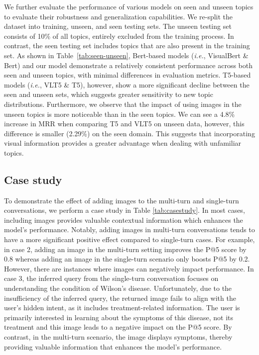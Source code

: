 \documentclass[11pt]{article}
\begin{document}
We further evaluate the performance of various models on seen and unseen topics to evaluate their robustness and generalization capabilities.  We re-split the \OurData{} dataset into training, unseen, and seen testing sets. The unseen testing set consists of 10\% of all topics, entirely excluded from the training process. In contrast, the seen testing set includes topics that are also present in the training set.
As shown in Table~\ref{tab:seen-unseen}, Bert-based models (\textit{i.e.}, VisualBert \& Bert) and our model demonstrate a relatively consistent performance across both seen and unseen topics, with minimal differences in evaluation metrics. T5-based models (\textit{i.e.}, VLT5 \& T5), however, show a more significant decline between the seen and unseen sets, which suggests greater sensitivity to new topic distributions. Furthermore, we observe that the impact of using images in the unseen topics is more noticeable than in the seen topics. We can see a 4.8\% increase in MRR when comparing T5 and VLT5 on unseen data, however, this difference is smaller (2.29\%) on the seen domain. This suggests that incorporating visual information provides a greater advantage when dealing with unfamiliar topics.

\subsection{Case study}
To demonstrate the effect of adding images to the multi-turn and single-turn conversations, we perform a case study in Table \ref{tab:casestudy}. In most cases, including images provides valuable contextual information which enhances the model's performance. Notably, adding images in multi-turn conversations tends to have a more significant positive effect compared to single-turn cases. For example, in case 2, adding an image in the multi-turn setting improves the P@5 score by 0.8 whereas adding an image in the single-turn scenario only boosts P@5 by 0.2. However, there are instances where images can negatively impact performance. In case 3, the inferred query from the single-turn conversation focuses on understanding the condition of Wilson's disease. Unfortunately, due to the insufficiency of the inferred query, the returned image fails to align with the user's hidden intent, as it includes treatment-related information. The user is primarily interested in learning about the symptoms of this disease, not its treatment and this image leads to a negative impact on the P@5 score. By contrast, in the multi-turn scenario, the image displays symptoms, thereby providing valuable information that enhances the model's performance.
\end{document}
